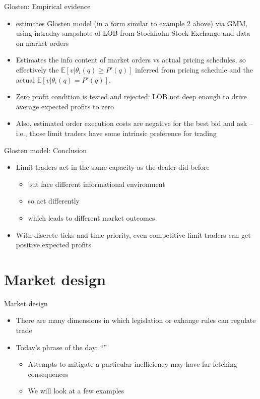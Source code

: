\documentclass[english,10pt
,aspectratio=169
]{beamer}
\begin{document}
\begin{frame}{Glosten: Empirical evidence}
	\begin{itemize}
		\item \textbf{\cite{sandas_adverse_2001}} estimates Glosten model (in a form similar to example 2 above) via GMM, using intraday snapshots of LOB from Stockholm Stock Exchange and data on market orders 
		\item Estimates the info content of market orders vs actual pricing schedules, so effectively the $\mathbb{E}[v|\theta_i(q) \geq P'(q)]$ inferred from pricing schedule and the actual $\mathbb{E}[v|\theta_i(q) = P'(q)]$.
		\item Zero profit condition is tested and rejected: LOB not deep enough to drive average expected profits to zero
		\item Also, estimated order execution costs are negative for the best bid and ask -- i.e., those limit traders have some intrinsic preference for trading
	\end{itemize}
\end{frame}


\begin{frame}{Glosten model: Conclusion}
\begin{itemize}
	\item Limit traders act in the same capacity as the dealer did before
	\begin{itemize}
		\item but face different \alert{informational environment}
		\item so act differently
		\item which leads to different market outcomes
	\end{itemize}
	\item With discrete ticks and time priority, even competitive limit traders can get positive expected profits
\end{itemize}
\end{frame}




\section{Market design}

\begin{frame}{Market design}
	\begin{itemize}
		\item There are many dimensions in which legislation or exhange rules can regulate trade
		\item Today's phrase of the day: ``''
		\begin{itemize}
			\item Attempts to mitigate a particular inefficiency may have far-fetching consequences
			\item We will look at a few examples
		\end{itemize}
	\end{itemize}
\end{frame}
\end{document}
